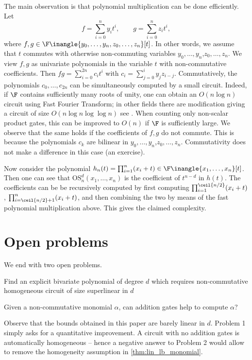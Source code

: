 \documentclass[11pt]{article}
\newcommand{\esym}[2]{\mathrm{OS}_{#1}^{#2}}
\begin{document}
The main observation is that polynomial multiplication can be done efficiently. Let
\[ 
  f= \sum_{i=0}^n y_i t^i, \qquad g= \sum_{i=0}^n z_i t^i,  
\] 
where $f,g\in \F\inangle{y_0,\dots, y_n, z_0,\dots, z_n}[t]$. 
In other words, we assume that $t$ commutes with otherwise non-commuting variables $y_0,\dots, y_n$,$ z_0,\dots, z_n$. 
We view  $f,g$ as univariate polynomials in the variable $t$ with non-commutative coefficients. 
Then $fg= \sum_{i=0}^{2n} c_i t^i $ with $c_i=\sum_{j=0}^i y_j z_{i-j}$. 
Commutatively, the polynomials $c_0,\dots,c_{2n}$ can be simultaneously computed by a small circuit.
Indeed, if $\F$ contains sufficiently many roots of unity, one can obtain an $O(n\log n)$ circuit using Fast Fourier Transform; in other fields there are modification giving a circuit of size $O(n\log n\log\log n)$ {see \cite{SS71, BCS97}}. 
When counting only non-scalar product gates, this can be improved to $O(n)$ if $\F$ is sufficiently large.  
We observe that the same holds if the coefficients of $f,g$ do not commute. 
This is because the polynomials $c_k$ are bilinear in $y_0,\dots, y_n$,$ z_0,\dots, z_n$. 
Commutativity does not make a difference in this case (an exercise). 

Now consider the polynomial $h_n(t)=\prod_{i=1}^{n} (x_i + t) \in \F\inangle{x_1, \ldots, x_n}[t]$. 
Then one can see that $\esym{n}{d}(x_1,\dots,x_n)$ is the coefficient of $t^{n-d}$ in $h(t)$. 
The coefficients can be be recursively computed by first computing $\prod_{i=1}^{\ceil{n/2}} (x_i + t)$,  $\prod_{i=\ceil{n/2}+1}^n (x_i + t)$, and then combining the two by means of the fast polynomial multiplication above. 
This gives the claimed complexity.

\section{Open problems}
We end with two open problems. 

\begin{openproblem} 
  Find an explicit bivariate polynomial of degree $d$ which requires non-commutative homogeneous circuit of size superlinear in $d$
\end{openproblem}

\begin{openproblem} 
  Given a non-commutative monomial $\alpha$, can addition gates help to compute $\alpha$? 
\end{openproblem}

Observe that the bounds obtained in this paper are barely linear in $d$. Problem 1 simply asks for a quantitative improvement. A circuit with no addition gates is automatically homogeneous -- hence a negative answer to Problem 2 would allow to remove the homogeneity assumption in \autoref{thm:lin_lb_monomial}. 
\end{document}
